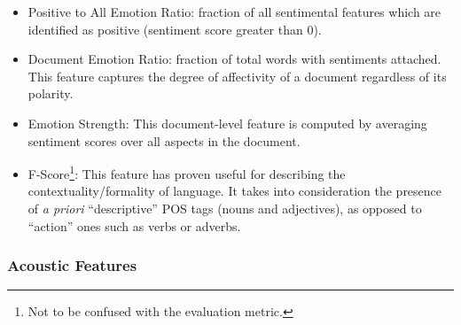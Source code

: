 \begin{itemize}
    \item Positive to All Emotion Ratio: fraction of all sentimental features which are identified as positive (sentiment score greater than 0). 
    \item Document Emotion Ratio: fraction of total words with sentiments attached. This feature captures the degree of affectivity of a document regardless of its polarity.
    \item Emotion Strength: This document-level feature is computed by averaging sentiment scores over all aspects in the document.
    \item F-Score\footnote{Not to be confused with the evaluation metric.}: This feature has proven useful for describing the contextuality/formality of language. It takes into consideration the presence of \textit{a priori} ``descriptive'' POS tags (nouns and adjectives), as opposed to ``action'' ones such as verbs or adverbs.
    
\end{itemize}

\subsubsection{Acoustic Features}

